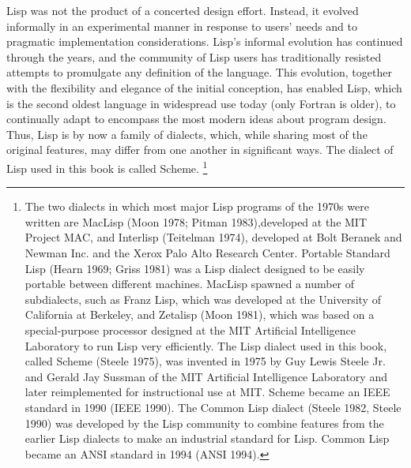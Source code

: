 Lisp was not the product of a concerted design effort.
Instead, it evolved informally in an experimental manner
in response to users' needs and to pragmatic implementation considerations.
Lisp's informal evolution has continued through the years,
and the community of Lisp users has traditionally resisted attempts
 to promulgate any  definition of the language.
This evolution, together with the flexibility and elegance of the initial conception,
has enabled Lisp, which is the second oldest language in widespread use today (only Fortran is older),
to continually adapt to encompass the most modern ideas about program design.
Thus, Lisp is by now a family of dialects, which,
while sharing most of the original features,
may differ from one another in significant ways.
The dialect of Lisp used in this book is called Scheme.
\footnote{%
   The two dialects in which most major Lisp programs of the 1970s were written are
   MacLisp (Moon 1978; Pitman 1983),developed at the MIT Project MAC, and Interlisp (Teitelman 1974),
   developed at Bolt Beranek and Newman Inc.
   and the Xerox Palo Alto Research Center.
   Portable Standard Lisp (Hearn 1969; Griss 1981)
   was a Lisp dialect designed to be easily portable between different machines.
   MacLisp spawned a number of subdialects,
   such as Franz Lisp,
   which was developed at the University of California at Berkeley,
   and Zetalisp (Moon 1981),
   which was based on a special-purpose processor designed
   at the MIT Artificial Intelligence Laboratory to run Lisp very efficiently.
   The Lisp dialect used in this book, called Scheme (Steele 1975),
   was invented in 1975 by Guy Lewis Steele Jr. and Gerald Jay Sussman of the MIT Artificial Intelligence Laboratory
   and later reimplemented for instructional use at MIT.
   Scheme became an IEEE standard in 1990 (IEEE 1990).
   The Common Lisp dialect (Steele 1982, Steele 1990) was developed by the Lisp community to combine features
   from the earlier Lisp dialects to make an industrial standard for Lisp.
   Common Lisp became an ANSI standard in 1994 (ANSI 1994).
}


